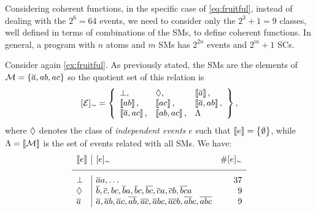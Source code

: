 \documentclass[x11names]{tlp}
\begin{document}
Considering coherent functions, in the specific case of \cref{eq:fruitful}, instead of dealing with the $2^6 = 64$ events, we need to consider only the
$2^3 + 1 = 9$ classes, well defined in terms of combinations of the \aclp{SM}, to define coherent functions.
In general, a program with $n$ atoms and $m$ \aclp{SM} has $2^{2n}$ events and $2^m + 1$ \aclp{SC}.

\ifExamples
	\begin{example}\label{ex:classes}\em

		Consider again \cref{ex:fruitful}.
As previously stated, the \aclp{SM} are
		the elements of $\MODELset = \set{\co{a}, ab, ac}$ so the quotient set of
		this relation is
		\begin{equation*}
			\class{\EVENTSset} = \set{
				\begin{array}{lll}
					\inconsistent,           &
					\indepclass,             &
					\stablecore{\co{a}},%
					\\
					\stablecore{ab},         &
					\stablecore{ac},         &
					\stablecore{\co{a}, ab},%
					\\
					\stablecore{\co{a}, ac}, &
					\stablecore{ab, ac},     &
					\consequenceclass
				\end{array}
			},
		\end{equation*}
		where $\Diamond$ denotes the class of \emph{independent
			events} $e$ such that $\left\llbracket e \right\rrbracket = \set{\emptyset}$,
		while $\consequenceclass = \stablecore{\MODELset}$ is the set of
		events related with all \acp{SM}.
We have:
		\begin{equation*}
			\begin{array}{l|lr}
				\stablecore{e}
				       & \class{e}
				       & \# \class{e}                                                                           %
				\\
				\hline
				\inconsistent
				       & \co{a}a, \ldots
				       & 37                                                                                     %
				\\
				\indepclass
				       & \co{b}, \co{c}, bc, \co{b}a, \co{b}c, \co{bc}, \co{c}a, \co{c}b, \co{bc}a
				       & 9                                                                                      %
				\\
				\co{a}
				       & \co{a}, \co{a}b, \co{a}c, \co{ab}, \co{ac}, \co{a}bc, \co{ac}b, \co{ab}c, \co{abc}
				       & 9                                                                                      %
				\\

\end{array}
\end{equation*}
\end{example}
\end{document}
